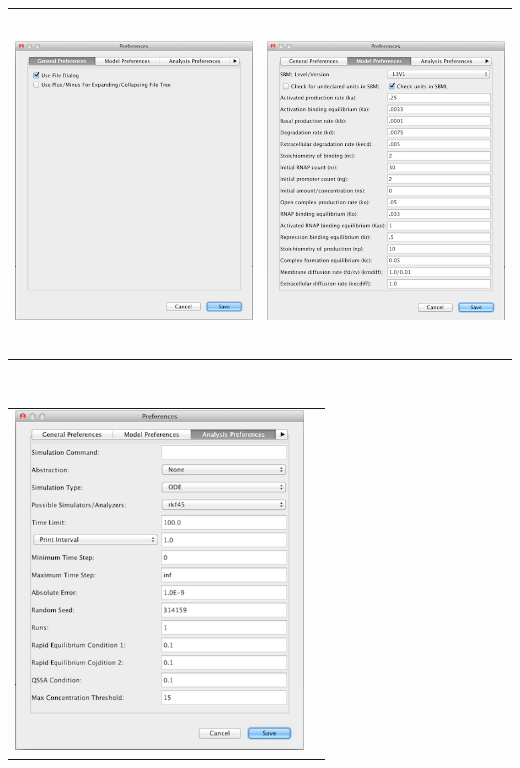 \documentclass[titlepage,11pt]{article}
\begin{document}
\begin{center}
\begin{tabular}{cc}
\includegraphics[height=90mm]{screenshots/GenPref} &
\includegraphics[height=90mm]{screenshots/ModelPref} 
\end{tabular} \\
\begin{tabular}{cc}
\includegraphics[height=90mm]{screenshots/AnaPref} &

\end{tabular}
\end{center}
\end{document}
